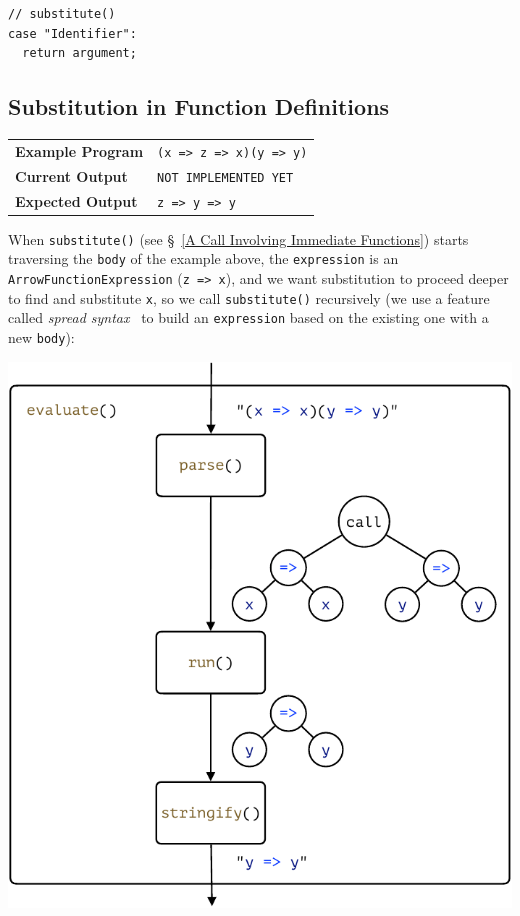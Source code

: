 \documentclass[12pt, oneside]{book}
\begin{document}
\begin{verbatim}
// substitute()
case "Identifier":
  return argument;
\end{verbatim}

\subsection{Substitution in Function Definitions}
\label{Substitution in Function Definitions}

\begin{center}
\begin{tabular}{ll}
\textbf{Example Program} & \texttt{(x => z => x)(y => y)} \\
\textbf{Current Output} & \texttt{NOT IMPLEMENTED YET} \\
\textbf{Expected Output} & \texttt{z => y => y} \\
\end{tabular}
\end{center}

When \texttt{substitute()} (see §~\ref{A Call Involving Immediate Functions}) starts traversing the \texttt{body} of the example above, the \texttt{expression} is an \texttt{ArrowFunctionExpression} (\texttt{z => x}), and we want substitution to proceed deeper to find and substitute \texttt{x}, so we call \texttt{substitute()} recursively (we use a feature called \emph{spread syntax}~\cite{javascript-spread-syntax} to build an \texttt{expression} based on the existing one with a new \texttt{body}):

\begin{center}
\includegraphics[page = 6]{images.pdf}
\end{center}
\end{document}
